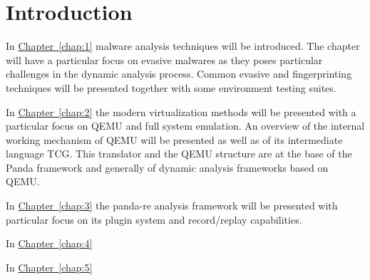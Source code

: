 \chapter{Introduction}



\bigskip
In \hyperref[chap:1]{Chapter~\ref*{chap:1}} malware analysis techniques will be introduced. The chapter will have a particular focus on evasive malwares as they poses particular challenges in the dynamic analysis process. Common evasive and fingerprinting techniques will be presented together with some environment testing suites. 


\bigskip
In \hyperref[chap:2]{Chapter~\ref*{chap:2}} the modern virtualization methods will be presented with a particular focus on QEMU and full system emulation. An overview of the internal working mechanism of QEMU will be presented as well as of its intermediate language TCG. This translator and the QEMU structure are at the base of the Panda framework and generally of dynamic analysis frameworks based on QEMU.


\bigskip
In \hyperref[chap:3]{Chapter~\ref*{chap:3}} the panda-re analysis framework will be presented with particular focus on its plugin system and record/replay capabilities. 


\bigskip
In \hyperref[chap:4]{Chapter~\ref*{chap:4}} 


\bigskip
In \hyperref[chap:5]{Chapter~\ref*{chap:5}} 